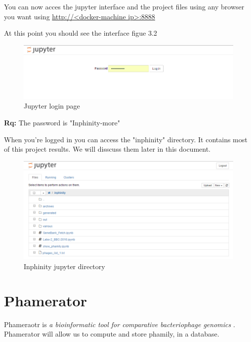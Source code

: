 \documentclass[a4paper,11pt]{report}
\begin{document}
You can now acces the jupyter interface and the project files using any browser you want using \url{http://<docker-machine ip>:8888}

At this point you should see the interface figue 3.2

\begin{figure}[H] 
	\begin{center}
		\includegraphics[scale=0.45]{img/login_jupyter}
		\caption{Jupyter login page}
	\end{center}
\end{figure}

\textbf{Rq:} The password is "Inphinity-more"

When you're logged in you can access the "inphinity" directory. It contains most of this project results. We will disscuss them later in this document.

\begin{figure}[H] 
	\begin{center}
		\includegraphics[scale=0.45]{img/inphinity_jupyter}
		\caption{Inphinity jupyter directory}
	\end{center}
\end{figure}

\section{Phamerator}
Phameraotr is \textit{a bioinformatic tool for comparative bacteriophage genomics} \cite{ref4}. Phamerator will allow us to compute and store phamily, in a database. 
\end{document}
